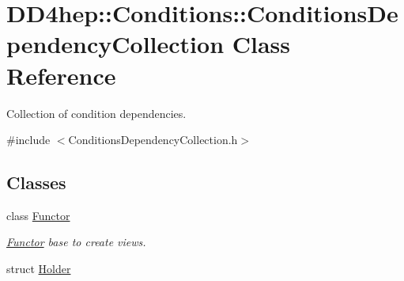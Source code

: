 \hypertarget{class_d_d4hep_1_1_conditions_1_1_conditions_dependency_collection}{
\section{DD4hep::Conditions::ConditionsDependencyCollection Class Reference}
\label{class_d_d4hep_1_1_conditions_1_1_conditions_dependency_collection}
}


Collection of condition dependencies.  


{\ttfamily \#include $<$ConditionsDependencyCollection.h$>$}\subsection*{Classes}
\begin{DoxyCompactItemize}
\item 
class \hyperlink{class_d_d4hep_1_1_conditions_1_1_conditions_dependency_collection_1_1_functor}{Functor}
\begin{DoxyCompactList}\small\item\em \hyperlink{class_d_d4hep_1_1_conditions_1_1_conditions_dependency_collection_1_1_functor}{Functor} base to create views. \item\end{DoxyCompactList}\item 
struct \hyperlink{struct_d_d4hep_1_1_conditions_1_1_conditions_dependency_collection_1_1_holder}{Holder}
\end{DoxyCompactItemize}
